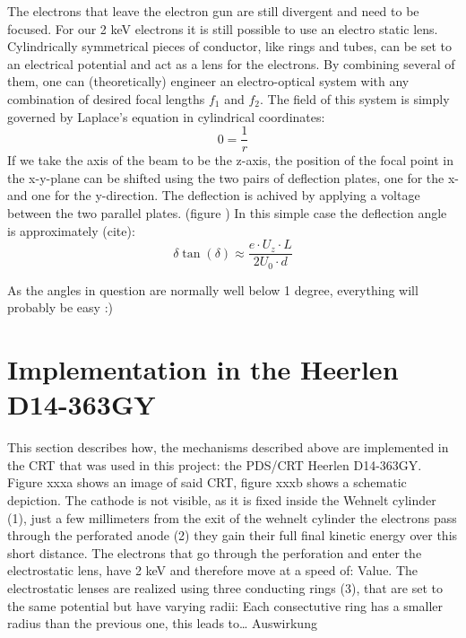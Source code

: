 The electrons that leave the electron gun are still divergent and need to be focused. For our 2 keV electrons it is still possible to use an electro static lens. Cylindrically symmetrical pieces of conductor, like rings and tubes, can be set to an electrical potential and act as a lens for the electrons. By combining several of them, one can (theoretically) engineer an electro-optical system with any combination of desired focal lengths $f_1$ and $f_2$. The field of this system is simply governed by Laplace's equation in cylindrical coordinates: 
\begin{equation}
	0=\dfrac{1}{r} %
\end{equation}
If we take the axis of the beam to be the z-axis, the position of the focal point in the x-y-plane can be shifted using the two pairs of deflection plates, one for the x- and one for the y-direction. The deflection is achived by applying a voltage between the two parallel plates. (figure ) In this simple case the deflection angle is approximately (cite):
\begin{equation}\label{key}
\delta \tan(\delta) \approx \frac{e \cdot U_z\cdot L}{2 U_0 \cdot d}
\end{equation}

As the angles in question are normally well below 1 degree, everything will probably be easy :) 

\section{Implementation in the Heerlen D14-363GY }

This section describes how, the mechanisms described above are implemented in the CRT that was used in this project: the PDS/CRT Heerlen D14-363GY. Figure xxxa  shows an image of said CRT, figure xxxb  shows a schematic depiction. The cathode is not visible, as it is fixed inside the Wehnelt cylinder (1), just a few millimeters from the exit of the wehnelt cylinder the electrons pass through the perforated anode (2) they gain their full final kinetic energy over this short distance. The electrons that go through the perforation and enter the electrostatic lens, have 2 keV and therefore move at a speed of:  Value. 
The electrostatic lenses are realized using three conducting rings (3), that are set to the same potential but have varying radii: Each consectutive ring has a smaller radius than the previous one, this leads to…  
 Auswirkung 

